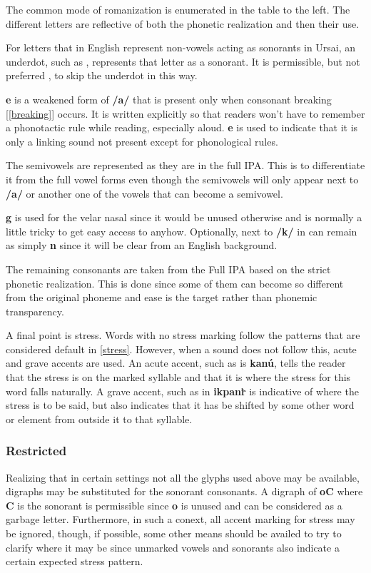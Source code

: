 \documentclass[11pt,letterpaper]{article}
\newcommand{\engma}{\textipa{N}}
\begin{document}
		\par 
		The common mode of romanization is enumerated in the table to the left.  The different letters are reflective of both the phonetic realization and then their use.  
		\par		
		For letters that in English represent non-vowels acting as sonorants in Ursai, an underdot, such as \textbf{}, represents that letter as a sonorant.  It is permissible, but not preferred , to skip the underdot in this way.
		\par
		\textbf{\textlangle{}e\textrangle{}} is a weakened form of \textbf{/a/} that is present only when consonant breaking [\ref{breaking}] occurs.  It is written explicitly so that readers won't have to remember a phonotactic rule while reading, especially aloud.  \textbf{\textlangle{}e\textrangle{}} is used to indicate that it is only a linking sound not present except for phonological rules.
		\par 
		The semivowels are represented as they are in the full IPA.  This is to differentiate it from the full vowel forms even though the semivowels will only appear next to \textbf{/a/} or another one of the vowels that can become a semivowel.
		\par 
		\textbf{\textlangle{}g\textrangle} is used for the velar nasal since it would be unused otherwise and \textbf{\engma} is normally a little tricky to get easy access to anyhow.  Optionally, next to \textbf{/k/} in can remain as simply \textbf{\textlangle{}n\textrangle{}} since it will be clear from an English background.
		\par 
		The remaining consonants are taken from the Full IPA based on the strict phonetic realization.  This is done since some of them can become so different from the original phoneme and ease is the target rather than phonemic transparency.
		\par 
		A final point is stress.  Words with no stress marking follow the patterns that are considered default in \ref{stress}.  However, when a sound does not follow this, acute and grave accents are used.  An acute accent, such as is \textbf{\textlangle{}kan\'u\textrangle}, tells the reader that the stress is on the marked syllable and that it is where the stress for this word falls naturally.  A grave accent, such as in \textbf{\textlangle{}ikpan\`r\textrangle{}} is indicative of where the stress is to be said, but also indicates that it has be shifted by some other word or element from outside it to that syllable.
		\subsubsection{Restricted}
		\par 
		Realizing that in certain settings not all the glyphs used above may be available, digraphs may be substituted for the sonorant consonants.  A digraph of \textbf{\textlangle{}oC\textrangle{}} where \textbf{C} is the sonorant is permissible since \textbf{o} is unused and can be considered as a garbage letter.  Furthermore, in such a conext, all accent marking for stress may be ignored, though, if possible, some other means should be availed to try to clarify where it may be since unmarked vowels and sonorants also indicate a certain expected stress pattern.
	
\end{document}
